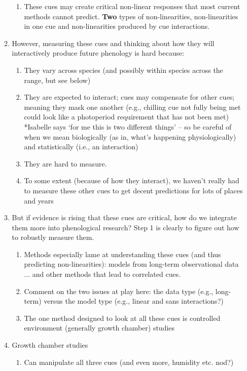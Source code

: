 \documentclass[11pt,letterpaper]{article}
\begin{document}
\begin{enumerate}
\begin{enumerate}
\begin{enumerate}
\item These cues may create critical non-linear responses that most current methods cannot predict. {\bf Two} types of non-linearities, non-linearities in one cue and non-linearities produced by cue interactions. 
\end{enumerate}
\item However, measuring these cues and thinking about how they will interactively produce future phenology is hard because:
\begin{enumerate}
\item They vary across species (and possibly within species across the range, but see below) \citep{vitasse2009,harrington2015} 
\item They are expected to interact; cues may compensate for other cues; meaning they mask one another (e.g., chilling cue not fully being met could look like a photoperiod requirement that has not been met) *Isabelle says `for me this is two different things' -- so be careful of when we mean biologically (as in, what's happening physiologically) and statistically (i.e., an interaction)
\item They are hard to measure.
\item To some extent (because of how they interact), we haven't really had to measure these other cues to get decent predictions for lots of places and years
\end{enumerate}
\item But if evidence is rising that these cues are critical, how do we integrate them more into phenological research? Step 1 is clearly to figure out how to robustly measure them. 
\begin{enumerate}
\item Methods especially lame at understanding these cues (and thus predicting non-linearities): models from long-term observational data ... and other methods that lead to correlated cues. 
\item Comment on the two issues at play here: the data type (e.g., long-term) versus the model type (e.g., linear and sans interactions?)
\item The one method designed to look at all these cues is controlled environment (generally growth chamber) studies \citep{nagano2012,satake2013} %
\end{enumerate}
\item Growth chamber studies
\begin{enumerate}
\item Can manipulate all three cues (and even more, humidity etc. nod?)

\end{enumerate}
\end{enumerate}
\end{enumerate}
\end{document}
